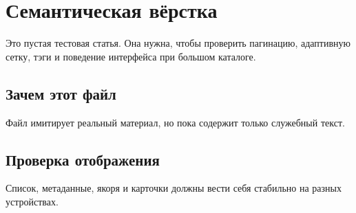 \section{Семантическая вёрстка}

Это пустая тестовая статья. Она нужна, чтобы проверить пагинацию, адаптивную сетку, тэги и поведение интерфейса при большом каталоге.

\subsection{Зачем этот файл}

Файл имитирует реальный материал, но пока содержит только служебный текст.

\subsection{Проверка отображения}

Список, метаданные, якоря и карточки должны вести себя стабильно на разных устройствах.
